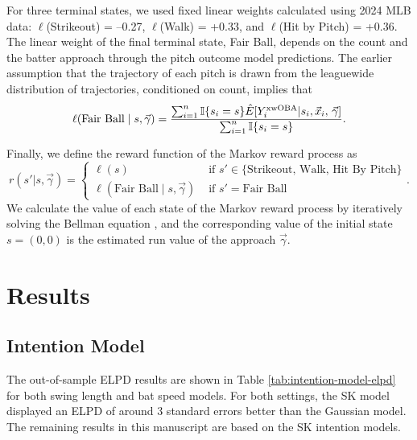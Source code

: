 \documentclass{article}
\begin{document}
      For three terminal states, we used fixed linear weights calculated using 2024 MLB data: $\ell$(Strikeout) = --0.27, $\ell$(Walk) = +0.33, and $\ell$(Hit by Pitch) = +0.36. The linear weight of the final terminal state, Fair Ball, depends on the count and the batter approach through the pitch outcome model predictions. The earlier assumption that the trajectory of each pitch is drawn from the leaguewide distribution of trajectories, conditioned on count, implies that
      \begin{equation*}
        \ell(\mbox{Fair Ball} \mid s, \vec\gamma) = \frac{
          \sum_{i = 1}^n \mathbb{I}\{s_i = s\} \hat E[Y_i^{\mbox{\scriptsize xwOBA}} | s_i, \vec x_i,\, \vec\gamma]
        }{
          \sum_{i = 1}^n \mathbb{I}\{s_i = s\}
        }.
      \end{equation*}

      Finally, we define the reward function of the Markov reward process as
      \begin{equation*}
          r(s' | s, \vec\gamma) = \begin{cases}
            \ell(s) & \mbox{ if } s' \in \{\mbox{Strikeout, Walk, Hit By Pitch}\}\\
            \ell(\mbox{Fair Ball} \mid s, \vec\gamma) & \mbox{ if } s' = \mbox{Fair Ball}
          \end{cases}.
      \end{equation*}
      We calculate the value of each state of the Markov reward process by iteratively solving the Bellman equation \citep{bellman_dynamic_1957}, and the corresponding value of the initial state $s = (0, 0)$ is the estimated run value of the approach $\vec\gamma$.

  \section{Results}
  \label{sec:results}
  

    \subsection{Intention Model}
    \label{sec:results-intention}

    The out-of-sample ELPD results are shown in Table \ref{tab:intention-model-elpd} for both swing length and bat speed models. For both settings, the SK model displayed an ELPD of around 3 standard errors better than the Gaussian model. The remaining results in this manuscript are based on the SK intention models.
\end{document}
